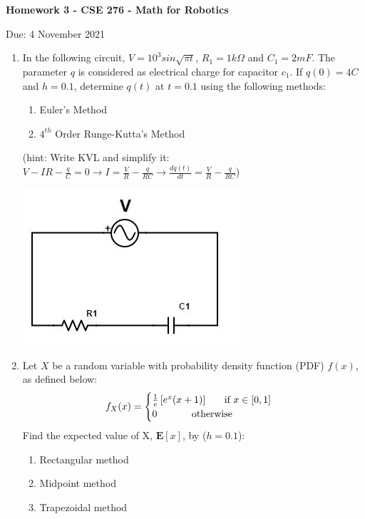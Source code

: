 \documentclass[12pt]{article}
\begin{document}
\centerline{\bf Homework 3 - CSE 276 - Math for Robotics}
\centerline{Due: 4 November 2021}

\begin{enumerate}
\item In the following circuit, $V=10^3 sin{\sqrt{\pi t}}$, $R_1=1k\Omega$ and $C_1=2mF$. The parameter $q$ is considered as electrical charge for capacitor $c_1$. If $q(0)=4C$ and $h=0.1$, determine $q(t)$ at $t=0.1$ using the following methods:

\begin{enumerate} 
	\item Euler's Method
	\item $4^{th}$ Order Runge-Kutta's Method
\end{enumerate}
 (hint: Write KVL and simplify it: $V-IR-\frac{q}{C}=0 \to I=\frac{V}{R}-\frac{q}{RC} \to \frac{dq(t)}{dt}=\frac{V}{R}-\frac{q}{RC}$)
\begin{center}
 \includegraphics[scale=1.0]{Capture}
\end{center}

 
 \item Let $X$ be a random variable with probability density function (PDF) $f(x)$, as defined below:
$$
f_X(x) = \begin{cases}
\frac{1}{e}\left [e^x(x+1)\right] \text{\hspace{0.5cm} if } x \in [0, 1] \\
\text{0 \hspace{1cm} otherwise}\\
\end{cases}
$$
Find the expected value of X, $\mathbf{E}[x]$, by ($h = 0.1$):
\\
\begin{enumerate}
\item Rectangular method
\item Midpoint method
\item Trapezoidal method
\end{enumerate}
 


\end{enumerate}
\end{document}

